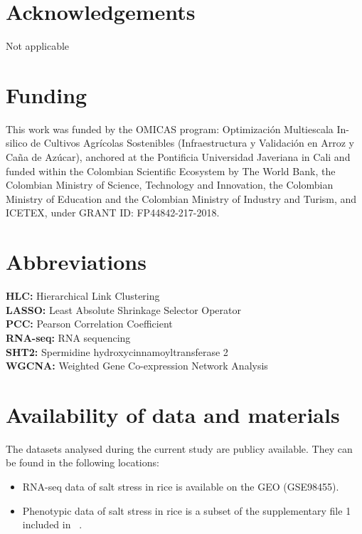 \documentclass{bmcart}
\begin{document}


\begin{backmatter}

\section*{Acknowledgements}%
Not applicable

\section*{Funding}%
This work was funded by the OMICAS program: Optimización Multiescala In-silico de
Cultivos Agrícolas Sostenibles (Infraestructura y Validación en Arroz y Caña de Azúcar),
anchored at the Pontificia Universidad Javeriana in Cali and funded within the Colombian
Scientific Ecosystem by The World Bank, the Colombian Ministry of Science, Technology and
Innovation, the Colombian Ministry of Education and the Colombian Ministry of Industry 
and Turism, and ICETEX, under GRANT ID: FP44842-217-2018.

\section*{Abbreviations}%
\textbf{HLC:} Hierarchical Link Clustering\\
\textbf{LASSO:} Least Absolute Shrinkage Selector Operator\\
\textbf{PCC:} Pearson Correlation Coefficient\\
\textbf{RNA-seq:} RNA sequencing\\
\textbf{SHT2:} Spermidine hydroxycinnamoyltransferase 2\\
\textbf{WGCNA:} Weighted Gene Co-expression Network Analysis\\

\section*{Availability of data and materials}%
The datasets analysed during the current study are publicy available. They can be found in the following locations:
\begin{itemize}
\item RNA-seq data of salt stress in rice is available on the GEO (GSE98455).
\item Phenotypic data of salt stress in rice is a subset of the supplementary file 1 included in ~\cite{campbell2017allelic}.
\end{itemize}


\end{backmatter}
\end{document}
